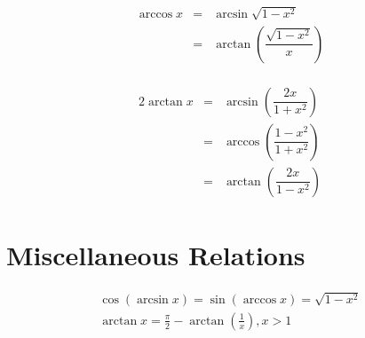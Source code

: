 \begin{equation}
	\begin{aligned}
		\begin{split}
			\arccos x & = & \arcsin \sqrt{1-x^2}\\
			& = & \arctan \left(\dfrac{\sqrt{1-x^2}}{x}\right)
		\end{split}
	\end{aligned}
\end{equation}

\begin{equation}
	\begin{aligned}
		\begin{split}
			2\arctan x & = & \arcsin\left(\dfrac{2x}{1+x^2}\right)\\
			& = & \arccos \left(\dfrac{1-x^2}{1+x^2}\right)\\
			& = & \arctan \left(\dfrac{2x}{1-x^2}\right)
		\end{split}
	\end{aligned}
\end{equation}


\section{Miscellaneous Relations}
\begin{align}
	\cos(\arcsin x)=\sin(\arccos x)=\sqrt{1-x^2}\\
	\arctan x=\frac{\pi}{2}-\arctan\left(\frac{1}{x}\right), x>1
\end{align}
